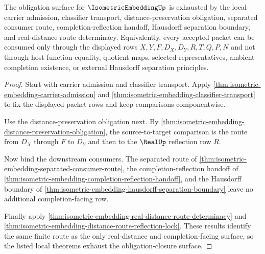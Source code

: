 \begin{theorem}
\label{thm:isometric-embedding-obligation-closure-surface}
The obligation surface for $\IsometricEmbeddingUp$ is exhausted by the local
carrier admission, classifier transport, distance-preservation obligation,
separated consumer route, completion-reflection handoff, Hausdorff separation
boundary, and real-distance route determinacy. Equivalently, every accepted
packet can be consumed only through the displayed rows
$X,Y,F,D_X,D_Y,R,T,Q,P,N$ and not through host function equality, quotient
maps, selected representatives, ambient completion existence, or external
Hausdorff separation principles.
\end{theorem}
\begin{proof}
Start with carrier admission and classifier transport. Apply
\autoref{thm:isometric-embedding-carrier-admission} and
\autoref{thm:isometric-embedding-classifier-transport} to fix the displayed
packet rows and keep comparisons componentwise.

Use the distance-preservation obligation next. By
\autoref{thm:isometric-embedding-distance-preservation-obligation}, the
source-to-target comparison is the route from $D_X$ through $F$ to $D_Y$ and
then to the $\RealUp$ reflection row $R$.

Now bind the downstream consumers. The separated route of
\autoref{thm:isometric-embedding-separated-consumer-route}, the
completion-reflection handoff of
\autoref{thm:isometric-embedding-completion-reflection-handoff}, and the
Hausdorff boundary of
\autoref{thm:isometric-embedding-hausdorff-separation-boundary} leave no
additional completion-facing row.

Finally apply \autoref{thm:isometric-embedding-real-distance-route-determinacy}
and \autoref{thm:isometric-embedding-distance-route-reflection-lock}. These
results identify the same finite route as the only real-distance and
completion-facing surface, so the listed local theorems exhaust the
obligation-closure surface.
\end{proof}

